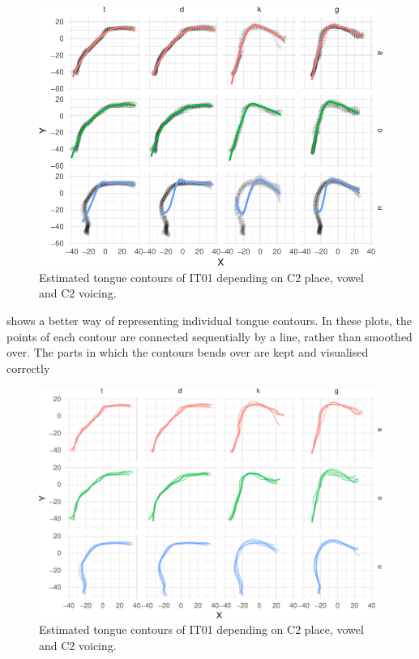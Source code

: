 \documentclass[12pt,]{article}
\begin{document}
\begin{figure}

{\centering \includegraphics[width=\linewidth]{2018-polar-gam_files/figure-latex/smooths-1} 

}

\caption{Estimated tongue contours of IT01 depending on C2 place, vowel and C2 voicing.}\label{f:smooths}
\end{figure}

 shows a better way of representing individual tongue
contours. In these plots, the points of each contour are connected
sequentially by a line, rather than smoothed over. The parts in which
the contours bends over are kept and visualised correctly

\begin{figure}

{\centering \includegraphics[width=\linewidth]{2018-polar-gam_files/figure-latex/paths-1} 

}

\caption{Estimated tongue contours of IT01 depending on C2 place, vowel and C2 voicing.}\label{f:paths}
\end{figure}
\end{document}
